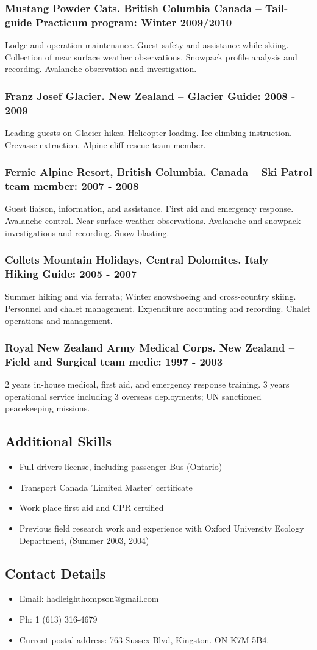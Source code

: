 \documentclass[]{article}
\begin{document}
\subsubsection*{Mustang Powder Cats. British Columbia Canada – Tail-guide Practicum program: Winter 2009/2010}
Lodge and operation maintenance. Guest safety and assistance while skiing. Collection of near surface weather observations. Snowpack profile analysis and recording. Avalanche observation and investigation. 
 \subsubsection*{Franz Josef Glacier. New Zealand – Glacier Guide: 2008 - 2009}
Leading guests on Glacier hikes. Helicopter loading. Ice climbing instruction. Crevasse extraction. Alpine
cliff rescue team member.
\subsubsection*{Fernie Alpine Resort, British Columbia. Canada – Ski Patrol team member: 2007 - 2008}
Guest liaison, information, and assistance. First aid and emergency response. Avalanche control. Near surface weather observations. Avalanche and snowpack investigations and recording. Snow blasting.
\subsubsection*{Collets Mountain Holidays, Central Dolomites. Italy – Hiking Guide: 2005 - 2007}
Summer hiking and via ferrata; Winter snowshoeing and cross-country skiing. Personnel and chalet management. Expenditure accounting and recording. Chalet operations and management.
\subsubsection*{Royal New Zealand Army Medical Corps. New Zealand – Field and Surgical team medic: 1997 - 2003}
2 years in-house medical, first aid, and emergency response training. 3 years operational service including 3 overseas deployments; UN sanctioned peacekeeping missions.

\subsection*{Additional Skills}
\begin{itemize}
\item Full drivers license, including passenger Bus (Ontario)
\item Transport Canada 'Limited Master' certificate
\item Work place first aid and CPR certified
\item Previous field research work and experience with Oxford University Ecology Department, (Summer 2003, 2004)
\end{itemize}

\subsection*{Contact Details}
\begin{itemize}
\item Email: hadleighthompson@gmail.com
\item Ph: 1 (613) 316-4679
\item Current postal address: 763 Sussex Blvd, Kingston. ON K7M 5B4.
\end{itemize}
\end{document}
